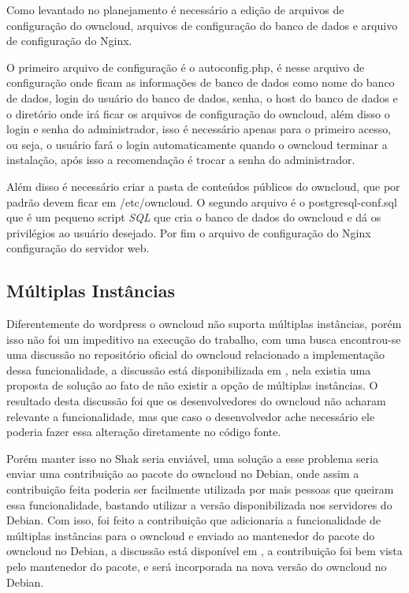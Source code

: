 Como levantado no planejamento é necessário a edição de arquivos de configuração
do owncloud, arquivos de configuração do banco de dados e arquivo de configuração
do Nginx.

O primeiro arquivo de configuração é o autoconfig.php, é nesse arquivo de
configuração onde ficam as informações de banco de dados como nome do banco de dados,
login do usuário do banco de dados, senha, o host do banco de dados e o diretório
onde irá ficar os arquivos de configuração do owncloud, além disso o login e senha
do administrador, isso é necessário apenas para o primeiro acesso, ou seja, o usuário
fará o login automaticamente quando o owncloud terminar a instalação, após isso
a recomendação é trocar a senha do administrador.

Além disso é necessário criar a pasta de conteúdos públicos do owncloud, que por
padrão devem ficar em /etc/owncloud. O segundo arquivo é o postgresql-conf.sql
que é um pequeno script \textit{SQL} que cria o banco de dados do owncloud e dá os
privilégios ao usuário desejado. Por fim o arquivo de configuração do Nginx
configuração do servidor web.

\subsection{Múltiplas Instâncias}

Diferentemente do wordpress o owncloud não suporta múltiplas instâncias, porém isso
não foi um impeditivo na execução do trabalho, com uma busca encontrou-se uma discussão no repositório
oficial do owncloud relacionado a implementação dessa funcionalidade, a discussão está
disponibilizada em \href{https://github.com/owncloud/core/pull/16424}, nela existia
uma proposta de solução ao fato de não existir a opção de múltiplas instâncias. O
resultado desta discussão foi que os desenvolvedores do owncloud não acharam relevante
a funcionalidade, mas que caso o desenvolvedor ache necessário ele poderia fazer essa
alteração diretamente no código fonte.

Porém manter isso no Shak seria enviável, uma solução a esse problema seria enviar
uma contribuição ao pacote do owncloud no Debian, onde assim a contribuição feita
poderia ser facilmente utilizada por mais pessoas que queiram essa funcionalidade,
bastando utilizar a versão disponibilizada nos servidores do Debian. Com isso, foi
feito a contribuição que adicionaria a funcionalidade de múltiplas instâncias para
o owncloud e enviado ao mantenedor do pacote do owncloud no Debian,
a discussão está disponível em \href{https://bugs.debian.org/cgi-bin/bugreport.cgi?bug=789726},
a contribuição foi bem vista pelo mantenedor do pacote, e será incorporada na nova
versão do owncloud no Debian.

